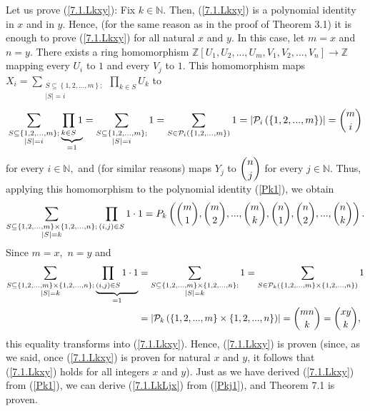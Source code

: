 \documentclass[numbers=enddot,12pt,final,onecolumn,notitlepage]{scrartcl}%
\begin{document}
Let us prove (\ref{7.1.Lkxy}): Fix $k\in\mathbb{N}$. Then, (\ref{7.1.Lkxy}) is
a polynomial identity in $x$ and in $y.$ Hence, (for the same reason as in the
proof of Theorem 3.1) it is enough to prove (\ref{7.1.Lkxy}) for all natural
$x$ and $y$. In this case, let $m=x$ and $n=y$. There exists a ring
homomorphism $\mathbb{Z}\left[  U_{1},U_{2},...,U_{m},V_{1},V_{2}%
,...,V_{n}\right]  \rightarrow\mathbb{Z}$ mapping every $U_{i}$ to $1$ and
every $V_{j}$ to $1$. This homomorphism maps $X_{i}=\sum
\limits_{\substack{S\subseteq\left\{  1,2,...,m\right\}  ;\\\left\vert
S\right\vert =i}}\prod\limits_{k\in S}U_{k}$ to%
\[
\sum\limits_{\substack{S\subseteq\left\{  1,2,...,m\right\}  ;\\\left\vert
S\right\vert =i}}\underbrace{\prod\limits_{k\in S}1}_{=1}=\sum
\limits_{\substack{S\subseteq\left\{  1,2,...,m\right\}  ;\\\left\vert
S\right\vert =i}}1=\sum\limits_{S\in\mathcal{P}_{i}\left(  \left\{
1,2,...,m\right\}  \right)  }1=\left\vert \mathcal{P}_{i}\left(  \left\{
1,2,...,m\right\}  \right)  \right\vert =\dbinom{m}{i}%
\]
for every $i\in\mathbb{N},$ and (for similar reasons) maps $Y_{j}$ to
$\dbinom{n}{j}$ for every $j\in\mathbb{N}$. Thus, applying this homomorphism
to the polynomial identity (\ref{Pk1}), we obtain%
\[
\sum_{\substack{S\subseteq\left\{  1,2,...,m\right\}  \times\left\{
1,2,...,n\right\}  ;\\\left\vert S\right\vert =k}}\prod_{\left(  i,j\right)
\in S}1\cdot1=P_{k}\left(  \dbinom{m}{1},\dbinom{m}{2},...,\dbinom{m}%
{k},\dbinom{n}{1},\dbinom{n}{2},...,\dbinom{n}{k}\right)  .
\]
Since $m=x,$ $n=y$ and
\begin{align*}
\sum_{\substack{S\subseteq\left\{  1,2,...,m\right\}  \times\left\{
1,2,...,n\right\}  ;\\\left\vert S\right\vert =k}}\underbrace{\prod_{\left(
i,j\right)  \in S}1\cdot1}_{=1}  &  =\sum_{\substack{S\subseteq\left\{
1,2,...,m\right\}  \times\left\{  1,2,...,n\right\}  ;\\\left\vert
S\right\vert =k}}1=\sum_{S\in\mathcal{P}_{k}\left(  \left\{
1,2,...,m\right\}  \times\left\{  1,2,...,n\right\}  \right)  }1\\
&  =\left\vert \mathcal{P}_{k}\left(  \left\{  1,2,...,m\right\}
\times\left\{  1,2,...,n\right\}  \right)  \right\vert =\dbinom{mn}{k}%
=\dbinom{xy}{k},
\end{align*}
this equality transforms into (\ref{7.1.Lkxy}). Hence, (\ref{7.1.Lkxy}) is
proven (since, as we said, once (\ref{7.1.Lkxy}) is proven for natural $x$ and
$y$, it follows that (\ref{7.1.Lkxy}) holds for all integers $x$ and $y$).
Just as we have derived (\ref{7.1.Lkxy}) from (\ref{Pk1}), we can derive
(\ref{7.1.LkLjx}) from (\ref{Pkj1}), and Theorem 7.1 is proven.
\end{document}
